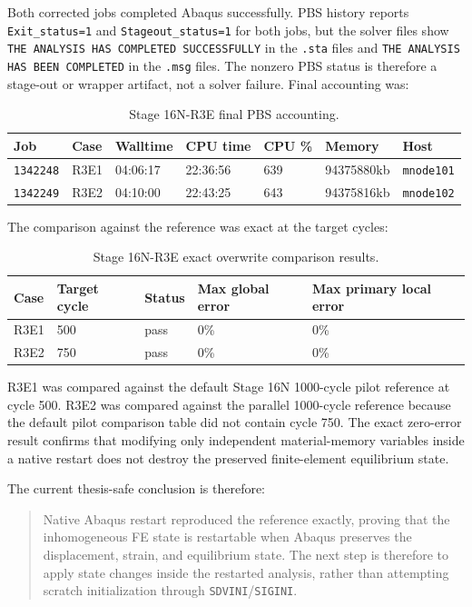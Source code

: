 \documentclass[11pt,a4paper]{article}
\newcommand{\code}[1]{\texttt{#1}}
\begin{document}
Both corrected jobs completed Abaqus successfully. PBS history reports \code{Exit\_status=1} and \code{Stageout\_status=1} for both jobs, but the solver files show \code{THE ANALYSIS HAS COMPLETED SUCCESSFULLY} in the \code{.sta} files and \code{THE ANALYSIS HAS BEEN COMPLETED} in the \code{.msg} files. The nonzero PBS status is therefore a stage-out or wrapper artifact, not a solver failure. Final accounting was:

\begin{table}[H]
\centering
\caption{Stage 16N-R3E final PBS accounting.}
\begin{tabular}{lllllll}
\toprule
Job & Case & Walltime & CPU time & CPU \% & Memory & Host \\
\midrule
\code{1342248} & R3E1 & 04:06:17 & 22:36:56 & 639 & 94375880kb & \code{mnode101} \\
\code{1342249} & R3E2 & 04:10:00 & 22:43:25 & 643 & 94375816kb & \code{mnode102} \\
\bottomrule
\end{tabular}
\end{table}

The comparison against the reference was exact at the target cycles:

\begin{table}[H]
\centering
\caption{Stage 16N-R3E exact overwrite comparison results.}
\begin{tabular}{lllll}
\toprule
Case & Target cycle & Status & Max global error & Max primary local error \\
\midrule
R3E1 & 500 & pass & 0\% & 0\% \\
R3E2 & 750 & pass & 0\% & 0\% \\
\bottomrule
\end{tabular}
\end{table}

R3E1 was compared against the default Stage 16N 1000-cycle pilot reference at cycle 500. R3E2 was compared against the parallel 1000-cycle reference because the default pilot comparison table did not contain cycle 750. The exact zero-error result confirms that modifying only independent material-memory variables inside a native restart does not destroy the preserved finite-element equilibrium state.

The current thesis-safe conclusion is therefore:

\begin{quote}
Native Abaqus restart reproduced the reference exactly, proving that the inhomogeneous FE state is restartable when Abaqus preserves the displacement, strain, and equilibrium state. The next step is therefore to apply state changes inside the restarted analysis, rather than attempting scratch initialization through \code{SDVINI}/\code{SIGINI}.
\end{quote}
\end{document}
